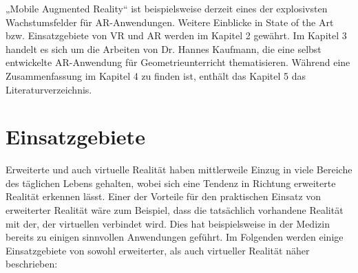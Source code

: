 \documentclass[deutsch]{llncs}
\begin{document}
„Mobile Augmented Reality“ ist beispielsweise derzeit eines der explosivsten Wachstumsfelder für AR-Anwendungen. Weitere Einblicke in State of the Art bzw. Einsatzgebiete von VR und AR werden im Kapitel 2 gewährt. Im Kapitel 3 handelt es sich um die Arbeiten von Dr. Hannes Kaufmann, die eine selbst entwickelte AR-Anwendung für Geometrieunterricht thematisieren. Während eine Zusammenfassung im Kapitel 4 zu finden ist, enthält das Kapitel 5 das Literaturverzeichnis.

\section{Einsatzgebiete}
Erweiterte und auch virtuelle Realität haben mittlerweile Einzug in viele Bereiche des täglichen Lebens gehalten, wobei sich eine Tendenz in Richtung erweiterte Realität erkennen lässt. Einer der Vorteile für den praktischen Einsatz von erweiterter Realität wäre zum Beispiel, dass die tatsächlich vorhandene Realität mit der, der virtuellen verbindet wird. Dies hat beispielsweise in der Medizin bereits zu einigen sinnvollen Anwendungen geführt. Im Folgenden werden einige Einsatzgebiete von sowohl erweiterter, als auch virtueller Realität näher beschrieben: 
\end{document}
